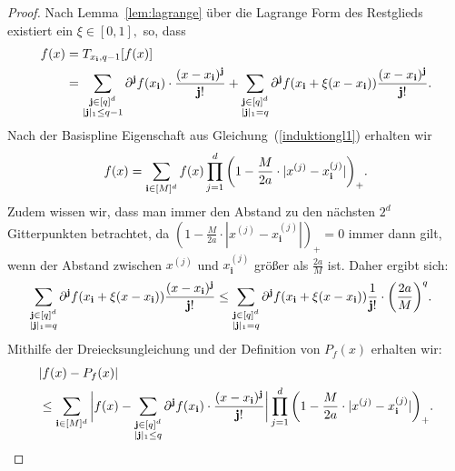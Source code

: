 \begin{proof}
Nach Lemma~\ref{lem:lagrange} über die Lagrange Form des Restglieds existiert ein $\xi \in [0, 1],$ so, dass 
\begin{equation}
\label{eq:lagrange}
\begin{split}
f(x) & = T_{x_{\mathbf{i}},q - 1}[f(x)] \\
& = \sum_{\substack{\mathbf{j} \in [q]^d \\ |\mathbf{j}|_1 \leq q - 1}}  \partial^{\mathbf{j}}f(x_{\mathbf{i}}) \cdot \frac{ (x - x_{\mathbf{i}})^{\mathbf{j}} }{\mathbf{j}!} + \sum_{\substack{ \mathbf{j} \in [q]^d \\|\mathbf{j}|_1 = q}} \partial^{\mathbf{j}}f(x_{\mathbf{i}} + \xi(x - x_{\mathbf{i}})) \frac{ (x - x_{\mathbf{i}})^{\mathbf{j}} }{\mathbf{j}!}.
\end{split}
\end{equation}
Nach der Basispline Eigenschaft aus Gleichung~(\ref{induktiongl1}) erhalten wir 
$$f(x) = \sum_{\mathbf{i} \in [M]^d} f(x) \prod_{j = 1}^d \bigg(1 - \frac{M}{2a} \cdot |x^{(j)} - x_{\mathbf{i}}^{(j)}|\bigg)_+.$$ Zudem wissen wir, dass man immer den Abstand zu den nächsten $2^d$ Gitterpunkten betrachtet, da  $(1 - \frac{M}{2a} \cdot |x^{(j)} - x_{\mathbf{i}}^{(j)}|)_+ = 0$ immer dann gilt, wenn der Abstand zwischen $x^{(j)}$ und $x_{\mathbf{i}}^{(j)}$ größer als $\frac{2a}{M}$ ist. Daher ergibt sich:
\begin{equation}
\label{eq:absch}
\begin{split}
& \sum_{\substack{ \mathbf{j} \in [q]^d \\ |\mathbf{j}|_1 = q}} \partial^{\mathbf{j}}f(x_{\mathbf{i}} + \xi(x - x_{\mathbf{i}})) \frac{ (x - x_{\mathbf{i}})^{\mathbf{j}} }{\mathbf{j}!} \leq \sum_{\substack{ \mathbf{j} \in [q]^d \\ |\mathbf{j}|_1 = q}} \partial^{\mathbf{j}}f(x_{\mathbf{i}} + \xi(x - x_{\mathbf{i}})) \frac{1}{\mathbf{j}!} \cdot \bigg(\frac{2a}{M}\bigg)^q.
\end{split}
\end{equation} 
Mithilfe der Dreiecksungleichung und der Definition von $P_f(x)$ erhalten wir:
\begin{equation}
\label{eq:drei}
\begin{split}
& |f(x) - P_f(x)| \\
& \leq \sum_{\mathbf{i} \in [M]^d} \bigg|f(x) - \sum_{\substack{\mathbf{j} \in [q]^d \\|\mathbf{j}|_1 \leq q}} \partial^{\mathbf{j}}f(x_{\mathbf{i}}) \cdot \frac{(x - x_{\mathbf{i}})^{\mathbf{j}}}{\mathbf{j}!}\bigg| \prod_{j = 1}^d \bigg(1 - \frac{M}{2a} \cdot |x^{(j)} - x_{\mathbf{i}}^{(j)}|\bigg)_+.
\end{split}
\end{equation}

\end{proof}
